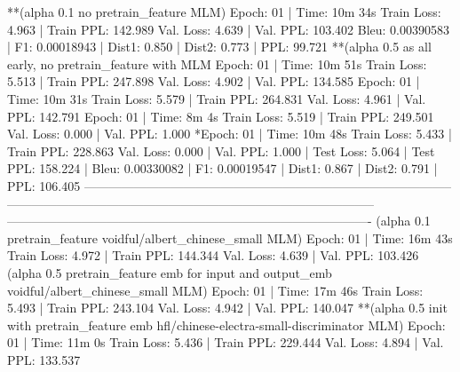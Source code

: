 \documentclass[letterpaper]{article} %
\begin{document}
\begin{CJK*}{UTF8}{gbsn}
**(alpha 0.1 no pretrain_feature MLM)
Epoch: 01 | Time: 10m 34s
	Train Loss: 4.963 | Train PPL: 142.989
	 Val. Loss: 4.639 |  Val. PPL: 103.402
Bleu: 0.00390583 | F1: 0.00018943 | Dist1: 0.850 | Dist2: 0.773 | PPL:  99.721
**(alpha 0.5 as all early, no pretrain_feature with MLM %
Epoch: 01 | Time: 10m 51s
	Train Loss: 5.513 | Train PPL: 247.898
	 Val. Loss: 4.902 |  Val. PPL: 134.585
Epoch: 01 | Time: 10m 31s
	Train Loss: 5.579 | Train PPL: 264.831
	 Val. Loss: 4.961 |  Val. PPL: 142.791
Epoch: 01 | Time: 8m 4s
	Train Loss: 5.519 | Train PPL: 249.501
	 Val. Loss: 0.000 |  Val. PPL:   1.000
*Epoch: 01 | Time: 10m 48s
	Train Loss: 5.433 | Train PPL: 228.863
	 Val. Loss: 0.000 |  Val. PPL:   1.000
| Test Loss: 5.064 | Test PPL: 158.224 |
Bleu: 0.00330082 | F1: 0.00019547 | Dist1: 0.867 | Dist2: 0.791 | PPL: 106.405
-----------------------------------------------------------------------------------------
-----------------------------------------------------------------------------------------
----------------------------------------------------------------------------------------
(alpha 0.1 pretrain_feature voidful/albert_chinese_small MLM)
Epoch: 01 | Time: 16m 43s
	Train Loss: 4.972 | Train PPL: 144.344
	 Val. Loss: 4.639 |  Val. PPL: 103.426
(alpha 0.5 pretrain_feature emb for input and output_emb voidful/albert_chinese_small MLM)
Epoch: 01 | Time: 17m 46s
	Train Loss: 5.493 | Train PPL: 243.104
	 Val. Loss: 4.942 |  Val. PPL: 140.047
**(alpha 0.5 init with pretrain_feature emb hfl/chinese-electra-small-discriminator MLM)
Epoch: 01 | Time: 11m 0s
	Train Loss: 5.436 | Train PPL: 229.444
	 Val. Loss: 4.894 |  Val. PPL: 133.537


\end{CJK*}
\end{document}
